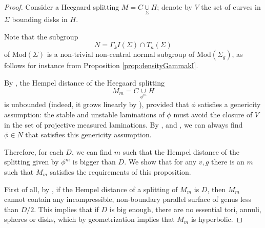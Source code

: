 \documentclass[12pt]{amsart}
\theoremstyle{definition}
\begin{document}
\begin{proof}
	Consider a Heegaard splitting $M=C \underset{\Sigma}{\cup} H$; denote by $V$ the set of curves in $\Sigma$ bounding disks in $H$.
	
	Note that the subgroup
	$$N=\Gamma_k I(\Sigma)\cap T_n(\Sigma)$$
	of $\mathrm{Mod}(\Sigma)$ is a non-trivial non-central normal subgroup of $\mathrm{Mod}(\Sigma_g)$, as follows for instance from Proposition \ref{prop:densityGammakI}. 
	
	 By \cite{Hempel}, the Hempel distance of the Heegaard splitting 
	$$M_m=C\underset{\phi^m}{\cup} H$$
	is unbounded (indeed, it grows linearly by \cite{AS}), provided that $\phi$ satisfies a genericity assumption: the stable and unstable laminations of $\phi$ must avoid the closure of $V$ in the set of projective measured laminations. By \cite[Lemma 2.6]{Long86}, \cite[Theorem 1.2]{Mas86} and \cite[Lemma 3.4]{Mah}, we can always find $\phi\in N$ that satisfies this genericity assumption.
	
	 Therefore, for each $D$, we can find $m$ such that the Hempel distance of the splitting given by $\phi^m$ is bigger than $D$. We show that for any $v,g$ there is an $m$ such that $M_m$ satisfies the requirements of this proposition.
	
	First of all, by \cite{Sch}, if the Hempel distance of a splitting of $M_m$ is $D$, then $M_m$ cannot contain any incompressible, non-boundary parallel surface of genus less than $D/2$. This implies that if $D$ is big enough, there are no essential tori, annuli, spheres or disks, which by geometrization implies that $M_m$ is hyperbolic.
	

\end{proof}
\end{document}
